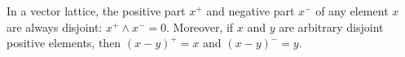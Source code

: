 In a vector lattice, the positive part $x^+$ and negative part $x^-$ of any element $x$ are always disjoint: $x^+ \wedge x^- = 0$. Moreover, if $x$ and $y$ are arbitrary disjoint positive elements, then $(x - y)^+ = x$ and $(x - y)^- = y$.
